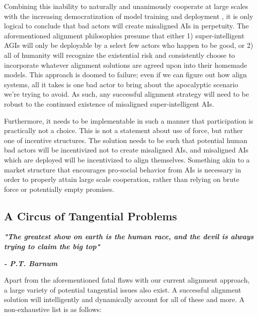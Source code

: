 \documentclass{article}[10pt]
\begin{document}
Combining this inability to naturally and unanimously cooperate at large scales with the increasing democratization of model training and deployment \cite{noMoat}, it is only logical to conclude that bad actors will create misaligned AIs in perpetuity.
The aforementioned alignment philosophies presume that either 1) super-intelligent AGIs will only be deployable by a select few actors who happen to be good, or 2) all of humanity will recognize the existential risk and consistently choose to incorporate whatever alignment solutions are agreed upon into their homemade models.
This approach is doomed to failure; even if we can figure out how align systems, all it takes is one bad actor to bring about the apocalyptic scenario we're trying to avoid.
As such, any successful alignment strategy will need to be robust to the continued existence of misaligned super-intelligent AIs.\par

Furthermore, it needs to be implementable in such a manner that participation is practically not a choice.
This is not a statement about use of force, but rather one of incentive structures.
The solution needs to be such that potential human bad actors will be incentivized not to create misaligned AIs, and misaligned AIs which are deployed will be incentivized to align themselves.
Something akin to a market structure that encourages pro-social behavior from AIs is necessary in order to properly attain large scale cooperation, rather than relying on brute force or potentially empty promises.

\subsection{A Circus of Tangential Problems}
\label{subsection:circus}

\noindent \begin{center}\begin{minipage}[t]{0.9\columnwidth}
    \textbf{\textit{"The greatest show on earth is the human race, and the devil is always trying to claim the big top"}}\par
    \textbf{\textit{- P.T. Barnum}}
\end{minipage}\end{center} 
\vspace{0.05in}

Apart from the aforementioned fatal flaws with our current alignment approach, a large variety of potential tangential issues also exist.
A successful alignment solution will intelligently and dynamically account for all of these and more.
A non-exhaustive list is as follows:\par
\end{document}
